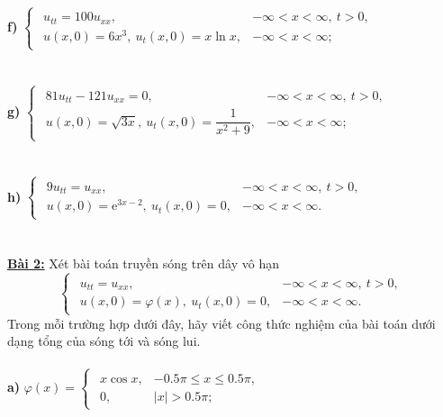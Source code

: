 \documentclass[10pt, a4paper]{article}
\begin{document}
	\textbf{f) }$\begin{cases}
		\begin{array}{ll}
			u_{tt}=100u_{xx}, & -\infty<x<\infty,~t>0,\\
			u(x,0)=6x^3,~u_t(x,0)=x\ln x, & -\infty<x<\infty;
		\end{array}
	\end{cases}$\\\\\\
	\textbf{g) }$\begin{cases}
		\begin{array}{ll}
			81u_{tt}-121u_{xx}=0, & -\infty<x<\infty,~t>0,\\
			u(x,0)=\sqrt{3x},~u_t(x,0)=\dfrac{1}{x^2+9}, & -\infty<x<\infty;
		\end{array}
	\end{cases}$\\\\\\
	\textbf{h) }$\begin{cases}
		\begin{array}{ll}
			9u_{tt}=u_{xx}, & -\infty<x<\infty,~t>0,\\
			u(x,0)=\mathrm e^{3x-2},~u_t(x,0)=0, & -\infty<x<\infty.
		\end{array}
	\end{cases}$\\\\\\
	\textbf{\color{red}\underline{Bài 2:}} Xét bài toán truyền sóng trên dây vô hạn $$\begin{cases}
		\begin{array}{ll}
			u_{tt}=u_{xx}, & -\infty<x<\infty,~t>0,\\
			u(x,0)=\varphi(x),~u_t(x,0)=0, & -\infty<x<\infty.
		\end{array}
	\end{cases}$$
	Trong mỗi trường hợp dưới đây, hãy viết công thức nghiệm của bài toán dưới dạng tổng của sóng tới và sóng lui.\\\\
	\textbf{a) }$\varphi(x)=\begin{cases}
		\begin{array}{ll}
			x\cos x, & -0.5\pi\le x\le0.5\pi,\\
			0, & |x|>0.5\pi;
		\end{array}
	\end{cases}$\\\\\\
\end{document}
